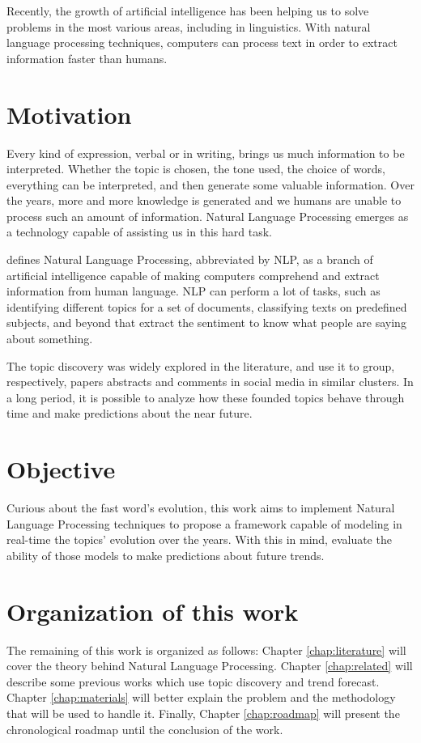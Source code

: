 Recently, the growth of artificial intelligence has been helping us to solve problems in the most various areas, including in linguistics. With natural language processing techniques, computers can process text in order to extract information faster than humans.

\section{Motivation}

Every kind of expression, verbal or in writing, brings us much information to be interpreted. Whether the topic is chosen, the tone used, the choice of words, everything can be interpreted, and then generate some valuable information. Over the years, more and more knowledge is generated and we humans are unable to process such an amount of information. Natural Language Processing emerges as a technology capable of assisting us in this hard task.

 defines Natural Language Processing, abbreviated by NLP, as a branch of artificial intelligence capable of making computers comprehend and extract information from human language. NLP can perform a lot of tasks, such as identifying different topics for a set of documents, classifying texts on predefined subjects, and beyond that extract the sentiment to know what people are saying about something. 

The topic discovery was widely explored in the literature,  and  use it to group, respectively, papers abstracts and comments in social media in similar clusters. In a long period, it is possible to analyze how these founded topics behave through time and make predictions about the near future. 

\section{Objective}

Curious about the fast word's evolution, this work aims to implement Natural Language Processing techniques to propose a framework capable of modeling in real-time the topics' evolution over the years. With this in mind, evaluate the ability of those models to make predictions about future trends.

\section{Organization of this work}

The remaining of this work is organized as follows: Chapter \ref{chap:literature} will cover the theory behind Natural Language Processing. Chapter \ref{chap:related} will describe some previous works which use topic discovery and trend forecast. Chapter \ref{chap:materials} will better explain the problem and the methodology that will be used to handle it. Finally, Chapter \ref{chap:roadmap} will present the chronological roadmap until the conclusion of the work.